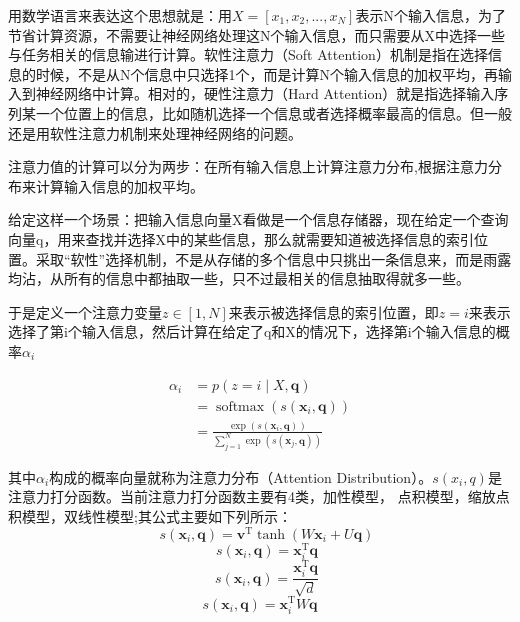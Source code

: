 用数学语言来表达这个思想就是：用$X=[x_1, x_2, ..., x_N]$表示N个输入信息，为了节省计算资源，不需要让神经网络处理这N个输入信息，而只需要从X中选择一些与任务相关的信息输进行计算。软性注意力（Soft Attention）机制是指在选择信息的时候，不是从N个信息中只选择1个，而是计算N个输入信息的加权平均，再输入到神经网络中计算。相对的，硬性注意力（Hard Attention）就是指选择输入序列某一个位置上的信息，比如随机选择一个信息或者选择概率最高的信息。但一般还是用软性注意力机制来处理神经网络的问题。

注意力值的计算可以分为两步：在所有输入信息上计算注意力分布,根据注意力分布来计算输入信息的加权平均。

给定这样一个场景：把输入信息向量X看做是一个信息存储器，现在给定一个查询向量q，用来查找并选择X中的某些信息，那么就需要知道被选择信息的索引位置。采取“软性”选择机制，不是从存储的多个信息中只挑出一条信息来，而是雨露均沾，从所有的信息中都抽取一些，只不过最相关的信息抽取得就多一些。

于是定义一个注意力变量$z\in [1, N]$来表示被选择信息的索引位置，即$z=i$来表示选择了第i个输入信息，然后计算在给定了q和X的情况下，选择第i个输入信息的概率$\alpha _i$

\begin{equation}
    \begin{aligned}
    \alpha_i &=p(z=i \mid X, \mathbf{q}) \\
    &=\operatorname{softmax}\left(s\left(\mathbf{x}_i, \mathbf{q}\right)\right) \\
    &=\frac{\exp \left(s\left(\mathbf{x}_i, \mathbf{q}\right)\right)}{\sum_{j=1}^N \exp \left(s\left(\mathbf{x}_j, \mathbf{q}\right)\right)}
    \end{aligned}
    \end{equation}

其中$\alpha _i$构成的概率向量就称为注意力分布（Attention Distribution）。$s(x_i , q)$是注意力打分函数。当前注意力打分函数主要有4类，加性模型， 点积模型，缩放点积模型，双线性模型;其公式主要如下列所示：
\begin{equation}
    \quad s\left(\mathbf{x}_i, \mathbf{q}\right)=\mathbf{v}^{\mathrm{T}} \tanh \left(W \mathbf{x}_i+U \mathbf{q}\right)
\end{equation}
\begin{equation}
    \quad s\left(\mathbf{x}_i, \mathbf{q}\right)=\mathbf{x}_i^{\mathrm{T}} \mathbf{q}    
\end{equation}
\begin{equation}
    \quad s\left(\mathbf{x}_i, \mathbf{q}\right)=\frac{\mathbf{x}_i^{\mathrm{T}} \mathbf{q}}{\sqrt{d}}    
\end{equation}
\begin{equation}
    s\left(\mathbf{x}_i, \mathbf{q}\right)=\mathbf{x}_i^{\mathrm{T}} W \mathbf{q}
\end{equation}


